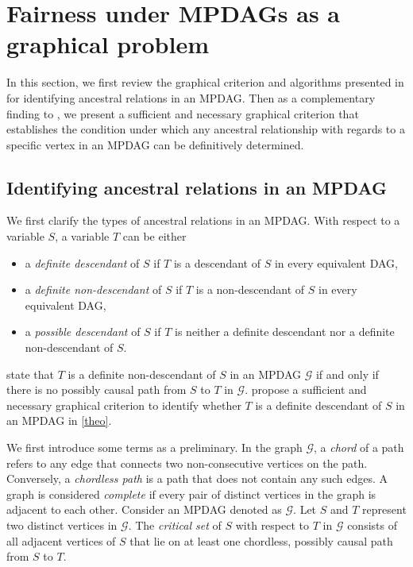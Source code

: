 \documentclass{article} %
\begin{document}
\section{Fairness under MPDAGs as a graphical problem} \label{appendix: Fairness}

In this section, we first review the graphical criterion and algorithms presented in \cite{zuo2022counterfactual} for identifying ancestral relations in an MPDAG. Then as a complementary finding to \citep[Proposition 5.2]{zuo2022counterfactual}, we present a sufficient and necessary graphical criterion that establishes the condition under which any ancestral relationship with regards to a specific vertex in an MPDAG can be definitively determined.

\subsection{Identifying ancestral relations in an MPDAG} \label{appendix: Counterfactual Fairness}
We first clarify the types of ancestral relations in an MPDAG. With respect to a variable $S$, a variable $T$ can be either
\begin{itemize}
\itemsep0em
    \item a \textit{definite descendant} of $S$ if $T$ is a descendant of $S$ in every equivalent DAG,
    \item a \textit{definite non-descendant} of $S$ if $T$ is a non-descendant of $S$ in every equivalent DAG,
    \item a \textit{possible descendant} of $S$ if $T$ is neither a definite descendant nor a definite non-descendant of $S$.
\end{itemize}

\citet{perkovic2017interpreting} state that $T$ is a definite non-descendant of $S$ in an MPDAG $\mathcal{G}$ if and only if there is no possibly causal path from $S$ to $T$ in $\mathcal{G}$. \citet{zuo2022counterfactual} propose a sufficient and necessary graphical criterion to identify whether $T$ is a definite descendant of $S$ in an MPDAG in \cref{theo}.

We first introduce some terms as a preliminary. In the graph $\mathcal{G}$, a \textit{chord} of a path refers to any edge that connects two non-consecutive vertices on the path. Conversely, a \textit{chordless path} is a path that does not contain any such edges. A graph is considered \textit{complete} if every pair of distinct vertices in the graph is adjacent to each other. Consider an MPDAG denoted as $\mathcal{G}$. Let $S$ and $T$ represent two distinct vertices in $\mathcal{G}$. The \textit{critical set} of $S$ with respect to $T$ in $\mathcal{G}$ consists of all adjacent vertices of $S$ that lie on at least one chordless, possibly causal path from $S$ to $T$.
\end{document}
